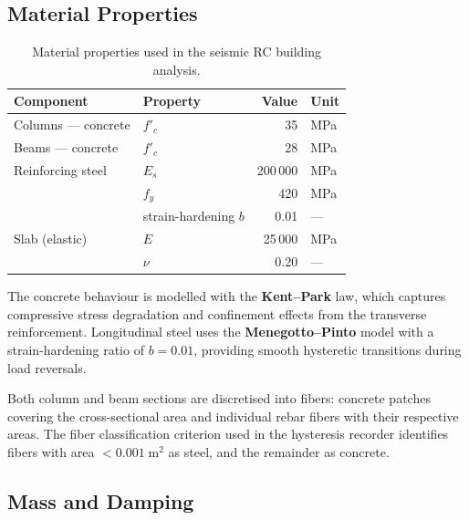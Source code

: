 \subsection{Material Properties}
\label{sec:seismic-rc-materials}

\begin{table}[htbp]
\centering
\caption{Material properties used in the seismic RC building analysis.}
\label{tab:seismic-rc-materials}
\begin{tabular}{@{} l l r l @{}}
\toprule
\textbf{Component} & \textbf{Property} & \textbf{Value} & \textbf{Unit} \\
\midrule
Columns --- concrete  & $f'_c$           & 35   & MPa \\
Beams --- concrete    & $f'_c$           & 28   & MPa \\
Reinforcing steel     & $E_s$            & 200\,000 & MPa \\
                      & $f_y$            & 420  & MPa \\
                      & strain-hardening $b$ & 0.01 & --- \\
Slab (elastic)        & $E$              & 25\,000  & MPa \\
                      & $\nu$            & 0.20 & --- \\
\bottomrule
\end{tabular}
\end{table}

The concrete behaviour is modelled with the \textbf{Kent--Park} law,
which captures compressive stress degradation and confinement effects
from the transverse reinforcement.  Longitudinal steel uses the
\textbf{Menegotto--Pinto} model with a strain-hardening ratio of
$b = 0.01$, providing smooth hysteretic transitions during
load reversals.

Both column and beam sections are discretised into fibers: concrete
patches covering the cross-sectional area and individual rebar fibers
with their respective areas.  The fiber classification criterion used in
the hysteresis recorder identifies fibers with area
$< 0.001\;\mathrm{m}^2$ as steel, and the remainder as concrete.


\subsection{Mass and Damping}


